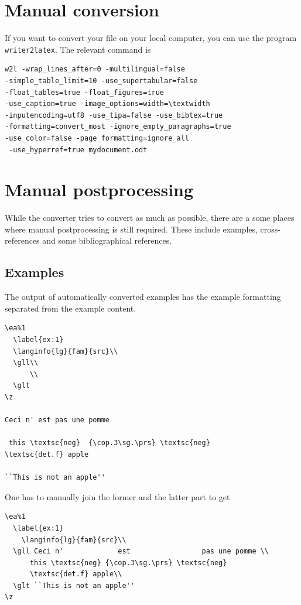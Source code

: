 \section{Manual conversion}
If you want to convert your file on your local computer, you can use the program \verb+writer2latex+. The relevant command is 
\begin{verbatim}
w2l -wrap_lines_after=0 -multilingual=false 
-simple_table_limit=10 -use_supertabular=false 
-float_tables=true -float_figures=true 
-use_caption=true -image_options=width=\textwidth 
-inputencoding=utf8 -use_tipa=false -use_bibtex=true  
-formatting=convert_most -ignore_empty_paragraphs=true 
-use_color=false -page_formatting=ignore_all
 -use_hyperref=true mydocument.odt
\end{verbatim}

\section{Manual postprocessing}
While the converter tries to convert as much as possible, there are a some places where manual postprocessing is still required.
These include examples, cross-references and some bibliographical references.

\subsection{Examples}
The output of automatically converted examples has the example formatting separated from the example content.  
\begin{verbatim}
\ea%1
  \label{ex:1}
  \langinfo{lg}{fam}{src}\\
  \gll\\
      \\
  \glt
\z

Ceci n' est pas une pomme

 this \textsc{neg}  {\cop.3\sg.\prs} \textsc{neg}   
\textsc{det.f} apple

``This is not an apple''
\end{verbatim}

One has to manually join the former and the latter part to get

\begin{verbatim}
\ea%1
  \label{ex:1}
    \langinfo{lg}{fam}{src}\\
  \gll Ceci n'             est                 pas une pomme \\
      this \textsc{neg} {\cop.3\sg.\prs} \textsc{neg}   
      \textsc{det.f} apple\\
  \glt ``This is not an apple''
\z 
\end{verbatim} 

